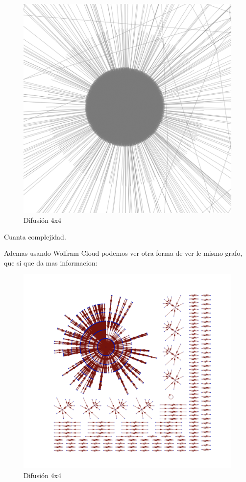 \documentclass[12pt, fleqn]{report}                             %
\theoremstyle{break}                                            %
\begin{document}
\begin{figure}[ht!]
          \includegraphics[height=0.4\textwidth]{dif45.png}
          \caption{Difusión 4x4}
        \end{figure}

        Cuanta complejidad.

        Ademas usando Wolfram Cloud podemos ver otra forma de ver le mismo grafo, que si que da mas informacion:
        \begin{figure}[ht!]
          \centering
          \includegraphics[height=\textwidth]{dif4x4.png}
          \caption{Difusión 4x4}
        \end{figure}
\end{document}
